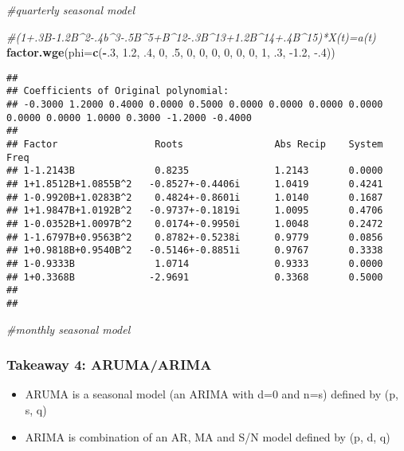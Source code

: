 \documentclass[
]{article}
\newenvironment{Shaded}{\begin{snugshade}}{\end{snugshade}}
\newcommand{\CommentTok}[1]{\textcolor[rgb]{0.56,0.35,0.01}{\textit{#1}}}
\newcommand{\DataTypeTok}[1]{\textcolor[rgb]{0.13,0.29,0.53}{#1}}
\newcommand{\DecValTok}[1]{\textcolor[rgb]{0.00,0.00,0.81}{#1}}
\newcommand{\FloatTok}[1]{\textcolor[rgb]{0.00,0.00,0.81}{#1}}
\newcommand{\KeywordTok}[1]{\textcolor[rgb]{0.13,0.29,0.53}{\textbf{#1}}}
\newcommand{\NormalTok}[1]{#1}
\newcommand{\OperatorTok}[1]{\textcolor[rgb]{0.81,0.36,0.00}{\textbf{#1}}}
\providecommand{\tightlist}{%
  \setlength{\itemsep}{0pt}\setlength{\parskip}{0pt}}
\begin{document}
\begin{Shaded}
\begin{Highlighting}[]
\CommentTok{#quarterly seasonal model}


\CommentTok{#(1+.3B-1.2B^2-.4b^3-.5B^5+B^12-.3B^13+1.2B^14+.4B^15)*X(t)=a(t)}
\KeywordTok{factor.wge}\NormalTok{(}\DataTypeTok{phi=}\KeywordTok{c}\NormalTok{(}\OperatorTok{-}\NormalTok{.}\DecValTok{3}\NormalTok{, }\FloatTok{1.2}\NormalTok{, }\FloatTok{.4}\NormalTok{, }\DecValTok{0}\NormalTok{, }\FloatTok{.5}\NormalTok{, }\DecValTok{0}\NormalTok{, }\DecValTok{0}\NormalTok{, }\DecValTok{0}\NormalTok{, }\DecValTok{0}\NormalTok{, }\DecValTok{0}\NormalTok{, }\DecValTok{0}\NormalTok{, }\DecValTok{1}\NormalTok{, }\FloatTok{.3}\NormalTok{, }\FloatTok{-1.2}\NormalTok{, }\FloatTok{-.4}\NormalTok{))}
\end{Highlighting}
\end{Shaded}

\begin{verbatim}
## 
## Coefficients of Original polynomial:  
## -0.3000 1.2000 0.4000 0.0000 0.5000 0.0000 0.0000 0.0000 0.0000 0.0000 0.0000 1.0000 0.3000 -1.2000 -0.4000 
## 
## Factor                 Roots                Abs Recip    System Freq 
## 1-1.2143B              0.8235               1.2143       0.0000
## 1+1.8512B+1.0855B^2   -0.8527+-0.4406i      1.0419       0.4241
## 1-0.9920B+1.0283B^2    0.4824+-0.8601i      1.0140       0.1687
## 1+1.9847B+1.0192B^2   -0.9737+-0.1819i      1.0095       0.4706
## 1-0.0352B+1.0097B^2    0.0174+-0.9950i      1.0048       0.2472
## 1-1.6797B+0.9563B^2    0.8782+-0.5238i      0.9779       0.0856
## 1+0.9818B+0.9540B^2   -0.5146+-0.8851i      0.9767       0.3338
## 1-0.9333B              1.0714               0.9333       0.0000
## 1+0.3368B             -2.9691               0.3368       0.5000
##   
## 
\end{verbatim}

\begin{Shaded}
\begin{Highlighting}[]
\CommentTok{#monthly seasonal model}
\end{Highlighting}
\end{Shaded}

\hypertarget{takeaway-4-arumaarima}{%
\subsubsection{Takeaway 4: ARUMA/ARIMA}\label{takeaway-4-arumaarima}}

\begin{itemize}
\tightlist
\item
  ARUMA is a seasonal model (an ARIMA with d=0 and n=s) defined by (p,
  s, q)
\item
  ARIMA is combination of an AR, MA and S/N model defined by (p, d, q)
\end{itemize}
\end{document}
